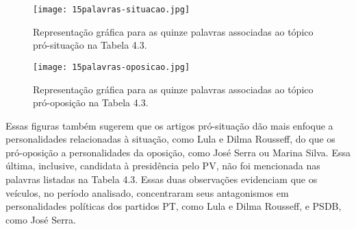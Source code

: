 \begin{figure}[h]
  \centering %
  \texttt{[image: 15palavras-situacao.jpg]}\\
  \caption{Representação gráfica para as quinze palavras associadas ao tópico pró-situação na Tabela 4.3.}
  \label{situacao}
\end{figure}

\begin{figure}[h]
  \centering %
  \texttt{[image: 15palavras-oposicao.jpg]}\\
  \caption{Representação gráfica para as quinze palavras associadas ao tópico pró-oposição na Tabela 4.3.}
  \label{oposicao}
\end{figure}




Essas figuras também sugerem que os artigos pró-situação dão mais enfoque a personalidades relacionadas à situação, como Lula e Dilma Rousseff, do que os pró-oposição a personalidades da oposição, como José Serra ou Marina Silva. Essa última, inclusive, candidata à presidência pelo PV, não foi mencionada nas palavras listadas na Tabela 4.3. Essas duas observações evidenciam que os veículos, no período analisado, concentraram seus antagonismos em personalidades políticas dos partidos PT, como Lula e Dilma Rousseff, e PSDB, como José Serra. 


